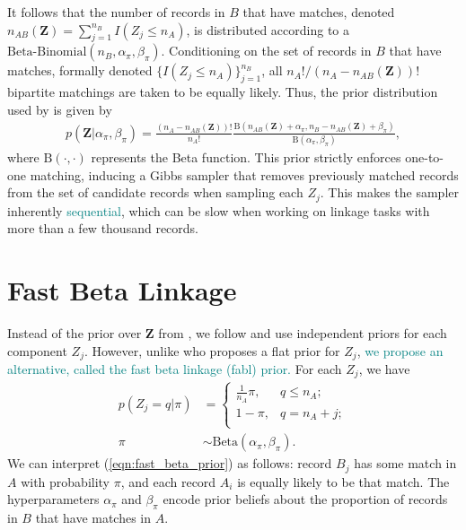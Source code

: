 \documentclass[ba]{imsart}
\begin{document}
It follows that the number of records in $B$ that have matches, denoted $n_{AB}(\bm{Z}) = \sum_{j=1}^{n_B} I(Z_j \leq n_A)$, is distributed according to a $\text{Beta-Binomial}(n_B, \alpha_{\pi}, \beta_{\pi})$. Conditioning on the set of records in $B$ that have matches, formally denoted $\{I(Z_j \leq n_A)\}_{j=1}^{n_B}$, all $n_A ! / (n_A - n_{AB}(\bm{Z}))!$ bipartite matchings are taken to be equally likely. Thus, the prior distribution used by \cite{sadinle_bayesian_2017} is given by
\begin{align}
\label{eqn:sadinle_prior}
p(\bm{Z}|\alpha_{\pi}, \beta_{\pi}) = \frac{(n_A - n_{AB}(\bm{Z}))!}{n_A !}\frac{\text{B}(n_{AB}(\bm{Z}) + \alpha_{\pi}, n_B - n_{AB}(\bm{Z}) + \beta_{\pi})}{\text{B}(\alpha_{\pi}, \beta_{\pi})},
\end{align}
where $\text{B}(\cdot, \cdot)$ represents the Beta function. This prior strictly enforces one-to-one matching, inducing a Gibbs sampler that removes previously matched records from the set of candidate records when sampling each $Z_j$. This makes the sampler inherently \textcolor{teal}{sequential}, which can be slow when working on linkage tasks with more than a few thousand records. 


\section{Fast Beta Linkage}
\label{sec:fast-beta-linkage}

Instead of the prior over $\bm{Z}$ from \cite{sadinle_bayesian_2017}, we follow \cite{wortman2019} and use independent priors for each component $Z_j$. However, unlike \cite{wortman2019} who proposes a flat prior for $Z_j$, 
\textcolor{teal}{we propose an alternative, called the fast beta linkage (fabl) prior.}
For each $Z_j$, we have
\begin{subequations}
\begin{align}
	p(Z_j = q| \pi) &= \begin{cases} 
	\frac{1}{n_A}\pi,  & q \leq n_A;\\
	1-\pi, &  q  = n_A + j;  \\
\end{cases} \label{eqn:fast_beta_prior}  \\
\pi &\sim \text{Beta}(\alpha_{\pi}, \beta_{\pi}) \label{eqn:fast_beta_prior2}.
\end{align}
\end{subequations}
We can interpret (\ref{eqn:fast_beta_prior}) as follows: record $B_j$ has some match in $A$ with probability $\pi$, and each record $A_i$ is equally likely to be that match. The hyperparameters $\alpha_{\pi}$ and $\beta_{\pi}$ encode prior beliefs about  the proportion of records in $B$ that have matches in $A.$ 
\end{document}
